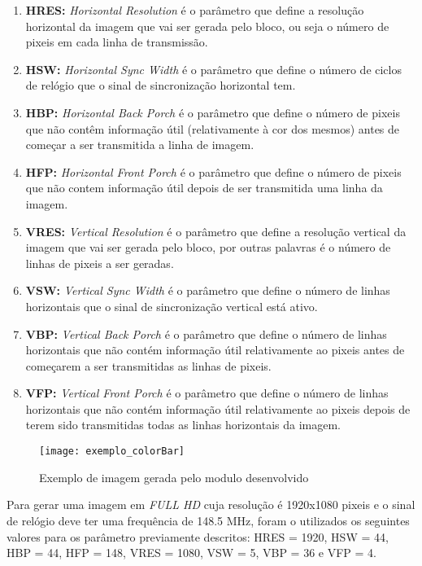 \begin{enumerate}
	\item \textbf{HRES:} \textit{Horizontal Resolution} é o parâmetro que define a resolução horizontal da imagem que vai ser gerada pelo bloco, ou seja o número de pixeis em cada linha de transmissão.
	\item \textbf{HSW:} \textit{Horizontal Sync Width} é o parâmetro que define o número de ciclos de relógio que o sinal de sincronização horizontal tem.
	\item \textbf{HBP:} \textit{Horizontal Back Porch} é o parâmetro que define o número de pixeis que não contêm informação útil (relativamente à cor dos mesmos) antes de começar a ser transmitida a linha de imagem.
	\item \textbf{HFP:} \textit{Horizontal Front Porch} é o parâmetro que define o número de pixeis que não contem informação útil depois de ser transmitida uma linha da imagem.
	\item \textbf{VRES:} \textit{Vertical Resolution} é o parâmetro que define a resolução vertical da imagem que vai ser gerada pelo bloco, por outras palavras é o número de linhas de pixeis a ser geradas.
	\item \textbf{VSW:} \textit{Vertical Sync Width} é o parâmetro que define o número de linhas horizontais que o sinal de sincronização vertical está ativo.
	\item \textbf{VBP:} \textit{Vertical Back Porch} é o parâmetro que define o número de linhas horizontais que não contém informação útil relativamente ao pixeis antes de começarem a ser transmitidas as linhas de pixeis.
	\item \textbf{VFP:} \textit{Vertical Front Porch} é o parâmetro que define o número de linhas horizontais que não contém informação útil relativamente ao pixeis depois de terem sido transmitidas todas as linhas horizontais da imagem.
\end{enumerate}
	
\begin{figure}[h!]
	\begin{center}
		\leavevmode
		\texttt{[image: exemplo\_colorBar]}
		\caption{Exemplo de imagem gerada pelo modulo desenvolvido}
		\label{fig:colorBar_exemple}
	\end{center}
\end{figure}

Para gerar uma imagem em \textit{FULL HD} cuja resolução é 1920x1080 pixeis e o sinal de relógio deve ter uma frequência de 148.5 MHz, foram o utilizados os seguintes valores para os parâmetro previamente descritos: HRES = 1920, HSW = 44, HBP = 44, HFP = 148,  VRES = 1080, VSW = 5, VBP = 36 e VFP = 4.

